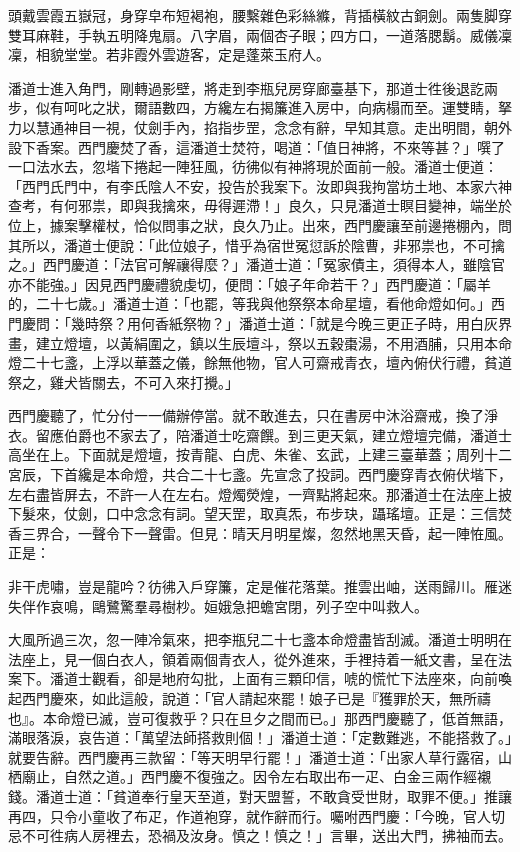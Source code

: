 \begin{myquote}
頭戴雲霞五嶽冠，身穿皁布短褐袍，腰繫雜色彩絲縧，背插橫紋古銅劍。兩隻脚穿雙耳麻鞋，手執五明降鬼扇。八字眉，兩個杏子眼；四方口，一道落腮鬍。威儀凜凜，相貌堂堂。若非霞外雲遊客，定是蓬萊玉府人。
\end{myquote}

潘道士進入角門，剛轉過影壁，將走到李瓶兒房穿廊臺基下，那道士徃後退訖兩步，似有呵叱之狀，爾語數四，方纔左右揭簾進入房中，向病榻而至。運雙睛，拏力以慧通神目一視，仗劍手內，掐指步罡，念念有辭，早知其意。{}走出明間，朝外設下香案。西門慶焚了香，這潘道士焚符，喝道：「值日神將，不來等甚？」噀了一口法水去，忽堦下捲起一陣狂風，彷彿似有神將現於面前一般。潘道士便道：「西門氏門中，有李氏陰人不安，投告於我案下。汝即與我拘當坊土地、本家六神查考，有何邪祟，即與我擒來，毋得遲滯！」良久，只見潘道士瞑目變神，端坐於位上，據案擊權杖，恰似問事之狀，{}良久乃止。出來，西門慶讓至前邊捲棚內，問其所以，潘道士便說：「此位娘子，惜乎為宿世冤愆訴於陰曹，非邪祟也，不可擒之。」西門慶道：「法官可解禳得麼？」潘道士道：「冤家債主，須得本人，雖陰官亦不能強。」{}因見西門慶禮貌虔切，便問：「娘子年命若干？」西門慶道：「屬羊的，二十七歲。」潘道士道：「也罷，等我與他祭祭本命星壇，看他命燈如何。」西門慶問：「幾時祭？用何香紙祭物？」潘道士道：「就是今晚三更正子時，用白灰界畫，建立燈壇，以黃絹圍之，鎮以生辰壇斗，祭以五穀棗湯，不用酒脯，只用本命燈二十七盞，上浮以華蓋之儀，餘無他物，官人可齋戒青衣，壇內俯伏行禮，貧道祭之，雞犬皆關去，不可入來打攪。」

西門慶聽了，忙分付一一備辦停當。就不敢進去，只在書房中沐浴齋戒，換了淨衣。留應伯爵也不家去了，陪潘道士吃齋饌。到三更天氣，建立燈壇完備，潘道士高坐在上。下面就是燈壇，按青龍、白虎、朱雀、玄武，上建三臺華蓋；周列十二宮辰，下首纔是本命燈，共合二十七盞。先宣念了投詞。西門慶穿青衣俯伏堦下，左右盡皆屏去，不許一人在左右。燈燭熒煌，一齊點將起來。那潘道士在法座上披下髮來，仗劍，口中念念有詞。望天罡，取真炁，布步玦，躡瑤壇。正是：三信焚香三界合，一聲令下一聲雷。但見：晴天月明星燦，忽然地黑天昏，起一陣恠風。正是：

\begin{myquote}
非干虎嘯，豈是龍吟？彷彿入戶穿簾，定是催花落葉。推雲出岫，送雨歸川。雁迷失伴作哀鳴，鷗鷺驚羣尋樹杪。姮娥急把蟾宮閉，列子空中叫救人。
\end{myquote}

大風所過三次，忽一陣冷氣來，把李瓶兒二十七盞本命燈盡皆刮滅。潘道士明明在法座上，見一個白衣人，領着兩個青衣人，從外進來，手裡持着一紙文書，呈在法案下。潘道士觀看，卻是地府勾批，上面有三顆印信，唬的慌忙下法座來，向前喚起西門慶來，如此這般，說道：「官人請起來罷！娘子已是『獲罪於天，無所禱也』。本命燈已滅，豈可復救乎？只在旦夕之間而已。」那西門慶聽了，低首無語，滿眼落淚，哀告道：「萬望法師搭救則個！」{}潘道士道：「定數難逃，不能搭救了。」就要告辭。西門慶再三款留：「等天明早行罷！」潘道士道：「出家人草行露宿，山栖廟止，自然之道。」西門慶不復強之。因令左右取出布一疋、白金三兩作經襯錢。潘道士道：「貧道奉行皇天至道，對天盟誓，不敢貪受世財，取罪不便。」推讓再四，只令小童收了布疋，作道袍穿，就作辭而行。囑咐西門慶：「今晚，官人切忌不可徃病人房裡去，恐禍及汝身。慎之！慎之！」言畢，送出大門，拂袖而去。

